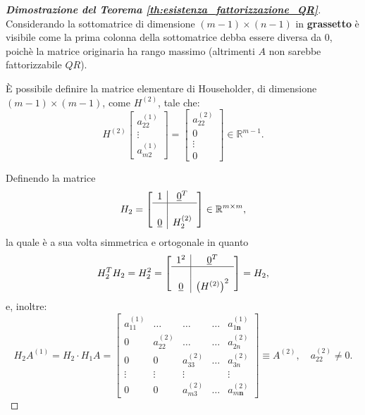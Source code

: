\begin{proof}[\textbf{Dimostrazione del Teorema \ref{th:esistenza_fattorizzazione_QR}}]
    Considerando la sottomatrice di dimensione $(m-1)\times(n-1)$ in \textbf{grassetto} è visibile come la prima colonna della sottomatrice debba essere diversa da 0, poichè la matrice originaria ha rango massimo (altrimenti $A$ non sarebbe fattorizzabile $QR$).
    
    È possibile definire la matrice elementare di Householder, di dimensione $(m-1)\times(m-1)$, come $H^{(2)}$, tale che:
    \begin{equation*}
        H^{(2)}\begin{bmatrix}
            a_{22}^{(1)}\\
            \vdots\\
            a_{m2}^{(1)}
        \end{bmatrix} = \begin{bmatrix}
            a_{22}^{(2)}\\
            0\\
            \vdots\\
            0
        \end{bmatrix}\in\mathbb R^{m-1}.
    \end{equation*}
    
    Definendo la matrice
    \begin{equation*}
        H_2 = 
        \left[\begin{array}{c|c}
            1 & \uline 0^T \\
            \hline\\
            \uline 0 & H_2^{(2)}
        \end{array}\right]\in\mathbb R^{m\times m},
    \end{equation*}
    la quale è a sua volta simmetrica e ortogonale in quanto
    \begin{equation*}
        H_2^TH_2=H_2^2=
        \left[\begin{array}{c|c}
            1^2 & \uline 0^T \\
            \hline\\
            \uline 0 & \left(H^{(2)}\right)^2
        \end{array}\right] = H_2,
    \end{equation*}
    e, inoltre:
    \begin{equation*}
        H_2A^{(1)} = H_2\cdot H_1 A =
        \begin{bmatrix}
            a_{11}^{(1)} &\hdots & \hdots & \hdots & a_{1\boldsymbol n}^{(1)}\\
            0 & a_{22}^{(2)} & \hdots & \hdots & a_{2n}^{(2)}\\
            0 & 0 & a_{33}^{(2)} & \hdots & a_{3n}^{(2)}\\
            \vdots & \vdots & \vdots & & \vdots\\
            0 & 0 & a_{m3}^{(2)} & \hdots & a_{m\boldsymbol n}^{(2)}
        \end{bmatrix}\equiv A^{(2)}, \quad a_{22}^{(2)}\neq 0.
    \end{equation*}
    

\end{proof}
